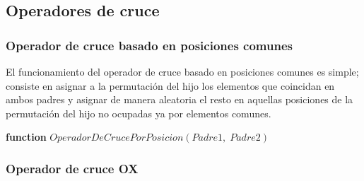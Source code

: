 \documentclass[11pt,a4paper]{article}
\begin{document}
	\subsection{Operadores de cruce}
	
		\subsubsection{Operador de cruce basado en posiciones comunes}
	
		\noindent El funcionamiento del operador de cruce basado en posiciones comunes es simple; consiste en asignar a la permutación del hijo los elementos que coincidan en ambos padres y asignar de manera aleatoria el resto en aquellas posiciones de la permutación del hijo no ocupadas ya por elementos comunes.

		\begin{algorithm}
	
			\textbf{function} $OperadorDeCrucePorPosicion(Padre1,\;Padre2)$
			
		\end{algorithm}
		
\newpage
	
	\subsubsection{Operador de cruce OX}
	
\end{document}

